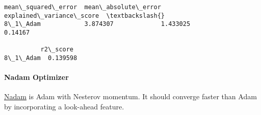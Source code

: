\documentclass[11pt]{article}
\makeatletter
\newcommand{\boxspacing}{\kern\kvtcb@left@rule\kern\kvtcb@boxsep}
\newcommand{\prompt}[4]{
        {\ttfamily\llap{{\color{#2}[#3]:\hspace{3pt}#4}}\vspace{-\baselineskip}}
    }
\makeatother
\begin{document}
            \begin{tcolorbox}[breakable, size=fbox, boxrule=.5pt, pad at break*=1mm, opacityfill=0]
\prompt{Out}{outcolor}{53}{\boxspacing}
\begin{Verbatim}[commandchars=\\\{\}]
          mean\_squared\_error  mean\_absolute\_error  explained\_variance\_score  \textbackslash{}
8\_1\_Adam            3.874307             1.433025                   0.14167

          r2\_score
8\_1\_Adam  0.139598
\end{Verbatim}
\end{tcolorbox}
        
    \paragraph{Nadam Optimizer}\label{nadam-optimizer}

\href{https://keras.io/api/optimizers/Nadam/}{Nadam} is Adam with
Nesterov momentum. It should converge faster than Adam by incorporating
a look-ahead feature.
\end{document}
